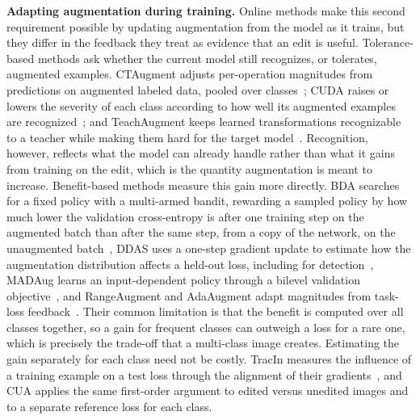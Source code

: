 \documentclass[conference]{IEEEtran}
\begin{document}
\noindent\textbf{Adapting augmentation during training.} Online methods make this second requirement possible by updating augmentation from the model as it trains, but they differ in the feedback they treat as evidence that an edit is useful. Tolerance-based methods ask whether the current model still recognizes, or tolerates, augmented examples. CTAugment adjusts per-operation magnitudes from predictions on augmented labeled data, pooled over classes~\cite{berthelot2020}; CUDA raises or lowers the severity of each class according to how well its augmented examples are recognized~\cite{ahn2023cuda}; and TeachAugment keeps learned transformations recognizable to a teacher while making them hard for the target model~\cite{suzuki2022teach}. Recognition, however, reflects what the model can already handle rather than what it gains from training on the edit, which is the quantity augmentation is meant to increase. Benefit-based methods measure this gain more directly. BDA searches for a fixed policy with a multi-armed bandit, rewarding a sampled policy by how much lower the validation cross-entropy is after one training step on the augmented batch than after the same step, from a copy of the network, on the unaugmented batch~\cite{lu2023bda}, DDAS uses a one-step gradient update to estimate how the augmentation distribution affects a held-out loss, including for detection~\cite{liu2021ddas}, MADAug learns an input-dependent policy through a bilevel validation objective~\cite{hou2023madaug}, and RangeAugment and AdaAugment adapt magnitudes from task-loss feedback~\cite{mehta2022rangeaugment,yang2025adaaugment}. Their common limitation is that the benefit is computed over all classes together, so a gain for frequent classes can outweigh a loss for a rare one, which is precisely the trade-off that a multi-class image creates. Estimating the gain separately for each class need not be costly. TracIn measures the influence of a training example on a test loss through the alignment of their gradients~\cite{pruthi2020tracin}, and CUA applies the same first-order argument to edited versus unedited images and to a separate reference loss for each class.
\end{document}
